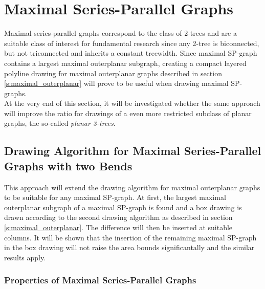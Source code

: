 \section{Maximal Series-Parallel Graphs}\label{section:SP-graphs}

Maximal series-parallel graphs correspond to the class of 2-trees \cite[P. 2]{straight-line_2-trees} and are a suitable class of interest for fundamental research since any 2-tree is biconnected, but not triconnected and inherits a constant treewidth. Since maximal SP-graph contains a largest maximal outerplanar subgraph, creating a compact layered polyline drawing for maximal outerplanar graphs described in section \ref{s:maximal_outerplanar} will prove to be useful when drawing maximal SP-graphs.\\
At the very end of this section, it will be investigated whether the same approach will improve the ratio for drawings of a even more restricted subclass of planar graphs, the so-called \emph{planar 3-trees}.

\subsection{Drawing Algorithm for Maximal Series-Parallel Graphs with two Bends}

This approach will extend the drawing algorithm for maximal outerplanar graphs to be suitable for any maximal SP-graph. At first, the largest maximal outerplanar subgraph of a maximal SP-graph is found and a box drawing is drawn according to the second drawing algorithm as described in section \ref{s:maximal_outerplanar}. The difference will then be inserted at suitable columns. It will be shown that the insertion of the remaining maximal SP-graph in the box drawing will not raise the area bounds significantally and the similar results apply.

\subsubsection{Properties of Maximal Series-Parallel Graphs}


